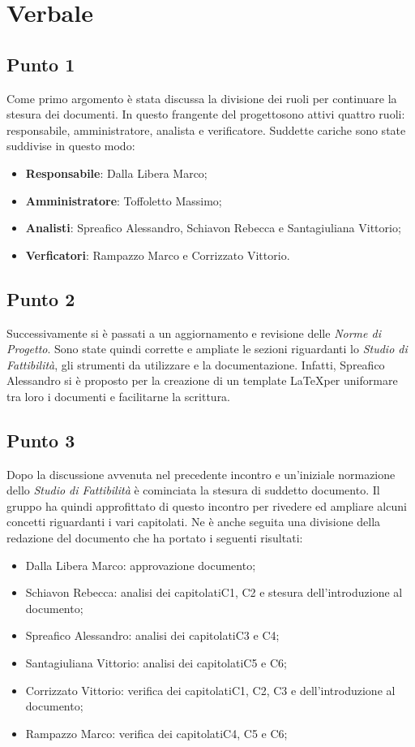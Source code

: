\section{Verbale}
    \subsection{Punto 1}
        Come primo argomento è stata discussa la divisione dei ruoli per continuare la stesura dei documenti. In questo frangente del progetto\glosp sono attivi quattro ruoli: responsabile, amministratore, analista e verificatore. Suddette cariche sono state suddivise in questo modo:
        \begin{itemize}
            \item \textbf{Responsabile}: Dalla Libera Marco;
            \item \textbf{Amministratore}: Toffoletto Massimo;
            \item \textbf{Analisti}: Spreafico Alessandro, Schiavon Rebecca e Santagiuliana Vittorio;
            \item \textbf{Verficatori}: Rampazzo Marco e Corrizzato Vittorio. 
        \end{itemize}
    \subsection{Punto 2}
        Successivamente si è passati a un aggiornamento e revisione delle \textit{Norme di Progetto}. Sono state quindi corrette e ampliate le sezioni riguardanti lo \textit{Studio di Fattibilità}, gli strumenti da utilizzare e la documentazione. Infatti, Spreafico Alessandro si è proposto per la creazione di un template \LaTeX per uniformare tra loro i documenti e facilitarne la scrittura.
    \subsection{Punto 3}
        Dopo la discussione avvenuta nel precedente incontro e un'iniziale normazione dello \textit{Studio di Fattibilità} è cominciata la stesura di suddetto documento. Il gruppo ha quindi approfittato di questo incontro per rivedere ed ampliare alcuni concetti riguardanti i vari capitolati\glo. Ne è anche seguita una divisione della redazione del documento che ha portato i seguenti risultati:
        \begin{itemize}
            \item Dalla Libera Marco: approvazione documento;
            \item Schiavon Rebecca: analisi dei capitolati\glosp C1, C2 e stesura dell'introduzione al documento;
            \item Spreafico Alessandro: analisi dei capitolati\glosp C3 e C4;
            \item Santagiuliana Vittorio: analisi dei capitolati\glosp C5 e C6;
            \item Corrizzato Vittorio: verifica dei capitolati\glosp C1, C2, C3 e dell'introduzione al documento;
            \item Rampazzo Marco: verifica dei capitolati\glosp C4, C5 e C6;
        \end{itemize}
